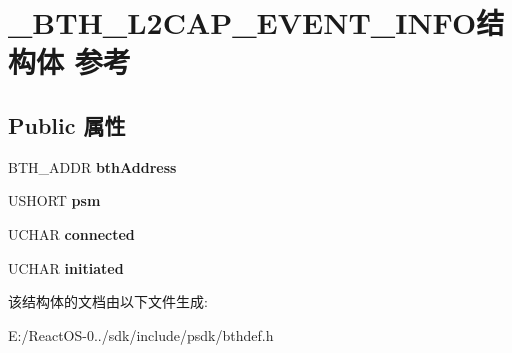 \hypertarget{struct___b_t_h___l2_c_a_p___e_v_e_n_t___i_n_f_o}{}\section{\+\_\+\+B\+T\+H\+\_\+\+L2\+C\+A\+P\+\_\+\+E\+V\+E\+N\+T\+\_\+\+I\+N\+F\+O结构体 参考}
\label{struct___b_t_h___l2_c_a_p___e_v_e_n_t___i_n_f_o}
\subsection*{Public 属性}
\begin{DoxyCompactItemize}
\item 
\mbox{\label{struct___b_t_h___l2_c_a_p___e_v_e_n_t___i_n_f_o_ac087571143e50a856f5f059f83815721}} 
B\+T\+H\+\_\+\+A\+D\+DR {\bfseries bth\+Address}
\item 
\mbox{\label{struct___b_t_h___l2_c_a_p___e_v_e_n_t___i_n_f_o_aa1a98a3343075134ebbfd30b141c82c9}} 
U\+S\+H\+O\+RT {\bfseries psm}
\item 
\mbox{\label{struct___b_t_h___l2_c_a_p___e_v_e_n_t___i_n_f_o_a38db3126cf6afce5a4a41baaa26c8a29}} 
U\+C\+H\+AR {\bfseries connected}
\item 
\mbox{\label{struct___b_t_h___l2_c_a_p___e_v_e_n_t___i_n_f_o_a60133db0afe362fb3b71d359e605c99f}} 
U\+C\+H\+AR {\bfseries initiated}
\end{DoxyCompactItemize}


该结构体的文档由以下文件生成\+:\begin{DoxyCompactItemize}
\item 
E\+:/\+React\+O\+S-\/0../sdk/include/psdk/bthdef.\+h\end{DoxyCompactItemize}
